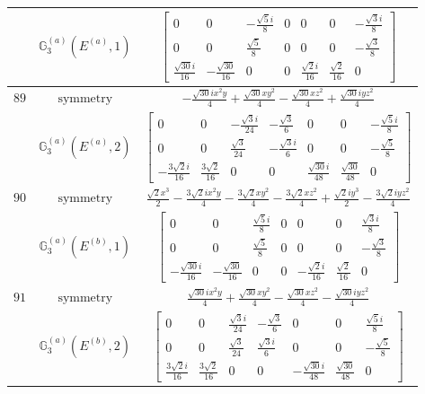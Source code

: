 \documentclass[fleqn,8pt,landscape]{jsarticle}
\begin{document}
\begin{longtable}{ccc}
$  $ & $ \mathbb{G}_{3}^{(a)}(E^{(a)},1) $ & $ \begin{bmatrix} 0 & 0 & - \frac{\sqrt{5} i}{8} & 0 & 0 & 0 & - \frac{\sqrt{3} i}{8} \\ 0 & 0 & \frac{\sqrt{5}}{8} & 0 & 0 & 0 & - \frac{\sqrt{3}}{8} \\ \frac{\sqrt{30} i}{16} & - \frac{\sqrt{30}}{16} & 0 & 0 & \frac{\sqrt{2} i}{16} & \frac{\sqrt{2}}{16} & 0 \end{bmatrix} $ \\ \hline
$ 89 $ & $ \text{symmetry} $ & $ - \frac{\sqrt{30} i x^{2} y}{4} + \frac{\sqrt{30} x y^{2}}{4} - \frac{\sqrt{30} x z^{2}}{4} + \frac{\sqrt{30} i y z^{2}}{4} $ \\
$  $ & $ \mathbb{G}_{3}^{(a)}(E^{(a)},2) $ & $ \begin{bmatrix} 0 & 0 & - \frac{\sqrt{3} i}{24} & - \frac{\sqrt{3}}{6} & 0 & 0 & - \frac{\sqrt{5} i}{8} \\ 0 & 0 & \frac{\sqrt{3}}{24} & - \frac{\sqrt{3} i}{6} & 0 & 0 & - \frac{\sqrt{5}}{8} \\ - \frac{3 \sqrt{2} i}{16} & \frac{3 \sqrt{2}}{16} & 0 & 0 & \frac{\sqrt{30} i}{48} & \frac{\sqrt{30}}{48} & 0 \end{bmatrix} $ \\ \hline
$ 90 $ & $ \text{symmetry} $ & $ \frac{\sqrt{2} x^{3}}{2} - \frac{3 \sqrt{2} i x^{2} y}{4} - \frac{3 \sqrt{2} x y^{2}}{4} - \frac{3 \sqrt{2} x z^{2}}{4} + \frac{\sqrt{2} i y^{3}}{2} - \frac{3 \sqrt{2} i y z^{2}}{4} $ \\
$  $ & $ \mathbb{G}_{3}^{(a)}(E^{(b)},1) $ & $ \begin{bmatrix} 0 & 0 & \frac{\sqrt{5} i}{8} & 0 & 0 & 0 & \frac{\sqrt{3} i}{8} \\ 0 & 0 & \frac{\sqrt{5}}{8} & 0 & 0 & 0 & - \frac{\sqrt{3}}{8} \\ - \frac{\sqrt{30} i}{16} & - \frac{\sqrt{30}}{16} & 0 & 0 & - \frac{\sqrt{2} i}{16} & \frac{\sqrt{2}}{16} & 0 \end{bmatrix} $ \\ \hline
$ 91 $ & $ \text{symmetry} $ & $ \frac{\sqrt{30} i x^{2} y}{4} + \frac{\sqrt{30} x y^{2}}{4} - \frac{\sqrt{30} x z^{2}}{4} - \frac{\sqrt{30} i y z^{2}}{4} $ \\
$  $ & $ \mathbb{G}_{3}^{(a)}(E^{(b)},2) $ & $ \begin{bmatrix} 0 & 0 & \frac{\sqrt{3} i}{24} & - \frac{\sqrt{3}}{6} & 0 & 0 & \frac{\sqrt{5} i}{8} \\ 0 & 0 & \frac{\sqrt{3}}{24} & \frac{\sqrt{3} i}{6} & 0 & 0 & - \frac{\sqrt{5}}{8} \\ \frac{3 \sqrt{2} i}{16} & \frac{3 \sqrt{2}}{16} & 0 & 0 & - \frac{\sqrt{30} i}{48} & \frac{\sqrt{30}}{48} & 0 \end{bmatrix} $ \\ \hline

\end{longtable}
\end{document}
